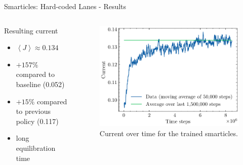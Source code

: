 \documentclass[10pt,xcolor=table, aspectratio=1610]{beamer}
\begin{document}
\begin{frame}{Smarticles: Hard-coded Lanes - Results}
  \begin{columns}
    \begin{block}{Resulting current}
      \begin{itemize}
        \item $\left\langle J \right\rangle \approx 0.134$
        \item $+157\%$ compared to baseline (0.052)
        \item $+15\%$ compared to previous policy (0.117)
        \item long equilibration time
      \end{itemize}
    \end{block}
    \begin{figure}
        \includegraphics[width=\textwidth]{../Thesis/img/results/speed_grad_current.pdf}
        \caption*{Current over time for the trained smarticles.}
      \end{figure}
  \end{columns}
\end{frame}
\end{document}
